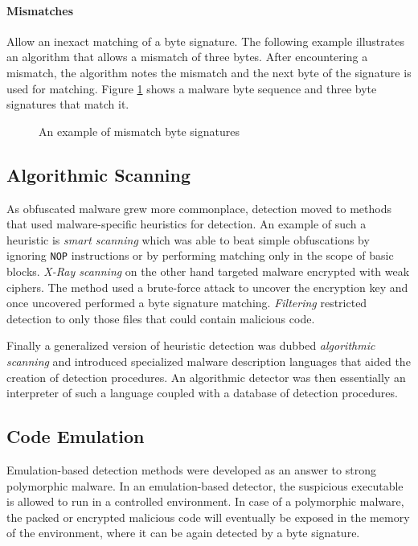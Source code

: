 \paragraph*{Mismatches} Allow an inexact matching of a byte signature. The following example illustrates an algorithm that allows a mismatch of three bytes. After encountering a mismatch, the algorithm notes the mismatch and the next byte of the signature is used for matching. Figure \ref{fig_mismatch} shows a malware byte sequence and three byte signatures that match it.

\begin{figure}[H]
    \centering
    \caption{An example of mismatch byte signatures}
    \label{fig_mismatch}
\end{figure}

\subsection{Algorithmic Scanning}
As obfuscated malware grew more commonplace, detection moved to methods that used malware-specific heuristics for detection. An example of such a heuristic is \emph{smart scanning} which was able to beat simple obfuscations by ignoring \texttt{NOP} instructions or by performing matching only in the scope of basic blocks. \emph{X-Ray scanning} on the other hand targeted malware encrypted with weak ciphers. The method used a brute-force attack to uncover the encryption key and once uncovered performed a byte signature matching. \emph{Filtering} restricted detection to only those files that could contain malicious code.

Finally a generalized version of heuristic detection was dubbed \emph{algorithmic scanning} and introduced specialized malware description languages that aided the creation of detection procedures. An algorithmic detector was then essentially an interpreter of such a language coupled with a database of detection procedures.

\subsection{Code Emulation}
Emulation-based detection methods were developed as an answer to strong polymorphic malware. In an emulation-based detector, the suspicious executable is allowed to run in a controlled environment. In case of a polymorphic malware, the packed or encrypted malicious code will eventually be exposed in the memory of the environment, where it can be again detected by a byte signature.

